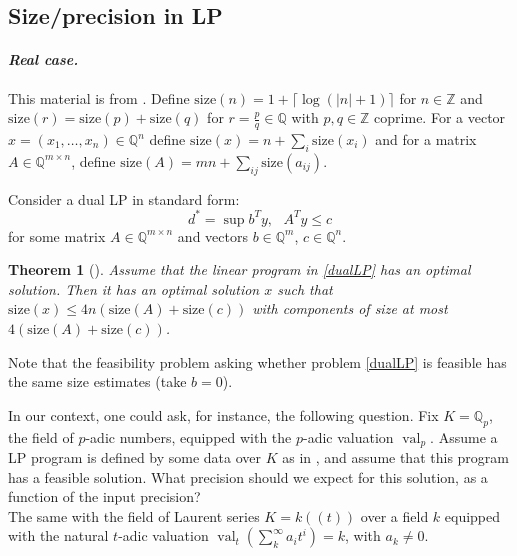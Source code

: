 \documentclass{amsart}
\newtheorem{theorem}{Theorem}[section]
\DeclareMathOperator{\val}{val}
\def\QQ{\ensuremath{\mathbb{Q}}}
\def\ZZ{\ensuremath{\mathbb{Z}}}
\def\size{\mathrm{size}}
\begin{document}
\subsection{Size/precision in LP}

\paragraph{\it Real case.}
This material is from \cite[Ch.4]{korte2008combinatorial}.
Define $\size(n) = 1+\lceil\log(|n|+1)\rceil$ for $n \in \ZZ$ and
$\size(r) = \size(p)+\size(q)$ for $r=\frac{p}q \in \QQ$ with $p,q \in \ZZ$ coprime.
For a vector $x = (x_1,\ldots,x_n) \in \QQ^n$ define $\size(x) = n+\sum_i \size(x_i)$
and for a matrix $A \in \QQ^{m \times n}$, define $\size(A) = mn+\sum_{ij} \size(a_{ij})$.

Consider a dual LP in standard form:
\begin{equation}\label{dualLP}
d^* = \sup b^Ty, \,\,\,\, A^Ty \leq c
\end{equation}
for some matrix $A \in \QQ^{m \times n}$ and vectors $b \in \QQ^m$, $c \in \QQ^n$.

\begin{theorem}[{\cite[Thm.4.4]{korte2008combinatorial}}]
  Assume that the linear program in \eqref{dualLP} has an optimal solution.
  Then it has an optimal solution $x$ such that $\size(x) \leq 4n(\size(A)+\size(c))$
  with components of size at most $4(\size(A)+\size(c))$.
\end{theorem}

Note that the feasibility problem asking whether problem \eqref{dualLP} is feasible
has the same size estimates (take $b=0$).

In our context, one could ask, for instance, the following question.
Fix $K=\QQ_p$, the field of $p$-adic numbers, equipped with
the $p$-adic valuation $\val_p$. Assume a LP program is defined by some data over $K$ as in
\cite[Sec.\,4]{cornou2026}, and assume that this program has a feasible solution.
What precision should we expect for this solution, as a function of the input precision? \\

The same with the field of Laurent series $K = k(\!(t)\!)$ over a field $k$
equipped with the natural $t$-adic valuation $\val_t(\sum_{k}^{\infty} a_i t^i) = k$, with
$a_k \neq 0$.


\end{document}
